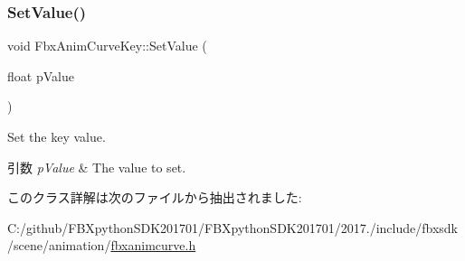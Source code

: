 \subsubsection{\texorpdfstring{Set\+Value()}{SetValue()}}
{\footnotesize\ttfamily void Fbx\+Anim\+Curve\+Key\+::\+Set\+Value (\begin{DoxyParamCaption}\item[{float}]{p\+Value }\end{DoxyParamCaption})}

Set the key value. 
\begin{DoxyParams}{引数}
{\em p\+Value} & The value to set. \\
\hline
\end{DoxyParams}


このクラス詳解は次のファイルから抽出されました\+:\begin{DoxyCompactItemize}
\item 
C\+:/github/\+F\+B\+Xpython\+S\+D\+K201701/\+F\+B\+Xpython\+S\+D\+K201701/2017./include/fbxsdk/scene/animation/\hyperlink{fbxanimcurve_8h}{fbxanimcurve.\+h}\end{DoxyCompactItemize}
